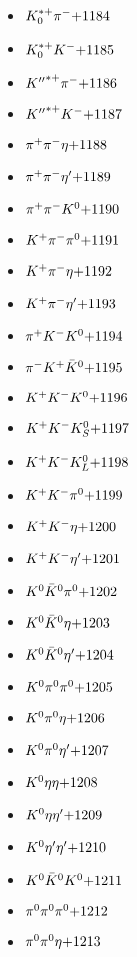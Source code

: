 \begin{multicols}{3}
\begin{itemize}
 \item $ K_{0}^{*+} \pi^{-} \hfill{+1184}$
 \item $ K_{0}^{*+} K^{-} \hfill{+1185}$
 \item $ {K^{\prime\prime}}^{*+} \pi^{-} \hfill{+1186}$
 \item $ {K^{\prime\prime}}^{*+} K^{-} \hfill{+1187}$
 \item $ \pi^{+} \pi^{-} \eta \hfill{+1188}$
 \item $ \pi^{+} \pi^{-} {\eta^{\prime}} \hfill{+1189}$
 \item $ \pi^{+} \pi^{-} K^{0} \hfill{+1190}$
 \item $ K^{+} \pi^{-} \pi^{0} \hfill{+1191}$
 \item $ K^{+} \pi^{-} \eta \hfill{+1192}$
 \item $ K^{+} \pi^{-} {\eta^{\prime}} \hfill{+1193}$
 \item $ \pi^{+} K^{-} K^{0} \hfill{+1194}$
 \item $ \pi^{-} K^{+} \bar{K}^{0} \hfill{+1195}$
 \item $ K^{+} K^{-} K^{0} \hfill{+1196}$
 \item $ K^{+} K^{-} K_{S}^{0} \hfill{+1197}$
 \item $ K^{+} K^{-} K_{L}^{0} \hfill{+1198}$
 \item $ K^{+} K^{-} \pi^{0} \hfill{+1199}$
 \item $ K^{+} K^{-} \eta \hfill{+1200}$
 \item $ K^{+} K^{-} {\eta^{\prime}} \hfill{+1201}$
 \item $ K^{0} \bar{K}^{0} \pi^{0} \hfill{+1202}$
 \item $ K^{0} \bar{K}^{0} \eta \hfill{+1203}$
 \item $ K^{0} \bar{K}^{0} {\eta^{\prime}} \hfill{+1204}$
 \item $ K^{0} \pi^{0} \pi^{0} \hfill{+1205}$
 \item $ K^{0} \pi^{0} \eta \hfill{+1206}$
 \item $ K^{0} \pi^{0} {\eta^{\prime}} \hfill{+1207}$
 \item $ K^{0} \eta \eta \hfill{+1208}$
 \item $ K^{0} \eta {\eta^{\prime}} \hfill{+1209}$
 \item $ K^{0} {\eta^{\prime}} {\eta^{\prime}} \hfill{+1210}$
 \item $ K^{0} \bar{K}^{0} K^{0} \hfill{+1211}$
 \item $ \pi^{0} \pi^{0} \pi^{0} \hfill{+1212}$
 \item $ \pi^{0} \pi^{0} \eta \hfill{+1213}$

\end{itemize}
\end{multicols}
